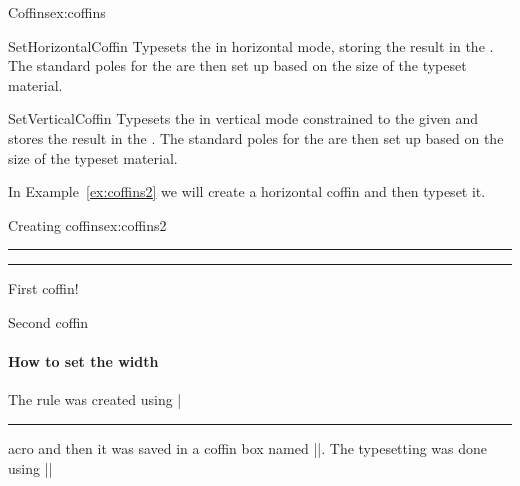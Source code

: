\begin{texexample}{Coffins}{ex:coffins}
  \NewCoffin \AnExampleCoffin
  \NewCoffin\Rulei
\end{texexample}

 \begin{docCommand}{SetHorizontalCoffin}{  }
   Typesets the  in horizontal mode, storing the result
   in the . The standard poles for the  are
   then set up based on the size of the typeset material.
 \end{docCommand}

 \begin{docCommand}{SetVerticalCoffin}{   }
   Typesets the  in vertical mode constrained to the
   given  and stores the result in the . The
   standard poles for the  are then set up based on the
   size of the typeset material.
 \end{docCommand}

In Example~\ref{ex:coffins2} we will create a horizontal coffin and then typeset it. 
 
          
\begin{texexample}{Creating coffins}{ex:coffins2}
\SetHorizontalCoffin\ExampleCoffin
   {\color{red}\rule{4cm}{1pc}}  
\SetHorizontalCoffin\Rulei
   {\color{blue}\rule{6cm}{1pc}}     
   
First coffin\hspace{0.9cm}\DisplayCoffinHandles{}\hspace{0.9cm}!
  
Second  coffin\hfill \DisplayCoffinHandles{}

\meaning\Rulei
\end{texexample}
  
\paragraph{How to set the width } The rule was created using \latexe |\rule|  macro and then it was saved in a coffin box named |\ExampleCoffin|. The typesetting was done using |\DisplayCoffinHandles| 

